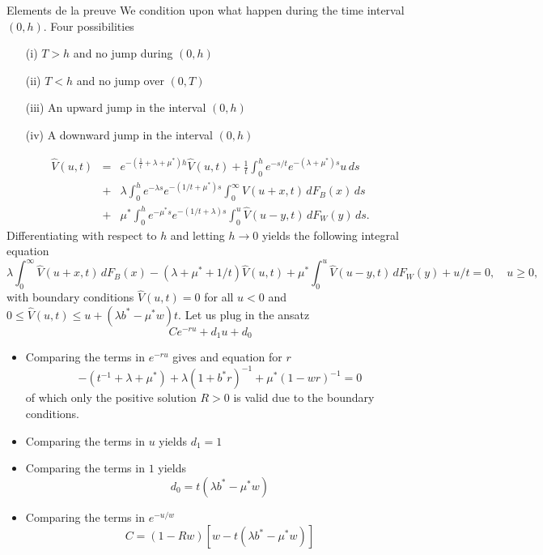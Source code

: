 \documentclass{beamer}
\def \w{\widehat}
\begin{document}
\begin{frame}[allowframebreaks]{Elements de la preuve}
\scriptsize
We condition upon what happen during the time interval $(0,h)$. Four possibilities
\begin{itemize}
  \item[(i)] $T>h$ and no jump during $(0,h)$
  \item[(ii)] $T<h$ and no jump over $(0,T)$
  \item[(iii)] An upward jump in the interval $(0,h)$
  \item[(iv)] A downward jump in the interval $(0,h)$
\end{itemize}
  \begin{eqnarray*}\label{neu0}
      \w{V}(u,t)&=& e^{-(\frac{1}{t}+\lambda+\mu^\ast)h}\w{V}(u,t) + \frac{1}{t}\int_0^h e^{-{s}/{t}}e^{-(\lambda +\mu^\ast) s} u\,ds\\
      & +& \lambda\int_0^he^{-\lambda s} e^{-({1}/{t}+\mu^\ast) s} \int_0^\infty\w{V}(u+x,t)\,dF_{B}(x)\,ds\\
      &  +&\mu^\ast \int_0^he^{-\mu^\ast s} e^{-({1}/{t}+\lambda) s}\int_0^u \w{V}(u-y,t) \,dF_W(y)\,ds.
  \end{eqnarray*}
  Differentiating with respect to $h$ and letting $h\rightarrow 0$ yields the following integral equation
  \begin{equation} \label{inteq}
    \lambda\int_0^\infty\w{V}(u+x,t)\,dF_{B}(x)-(\lambda+\mu^\ast+{1}/{t})\w{V}(u,t)+\mu^\ast\int_0^u \w{V}(u-y,t) \,dF_W(y)+{u}/{t}=0,\quad u\ge 0,
  \end{equation}
  with boundary conditions $\w{V}(u,t)=0$ for all $u<0$ and $0\leq\w{V}(u,t)\leq u+(\lambda b^\ast - \mu^\ast w)t$. Let us plug in the ansatz
  $$
  Ce^{-ru}+d_1u+d_0
  $$
  \begin{itemize}
    \item Comparing the terms in $e^{-r u}$ gives and equation for $r$
    $$
    -(t^{-1}+\lambda+\mu^\ast)+\lambda(1+b^\ast r)^{-1}+\mu^\ast(1-wr)^{-1}=0
    $$
    of which only the positive solution $R>0$ is valid due to the boundary conditions.
    \item Comparing the terms in $u$ yields $d_1 = 1$
    \item Comparing the terms in $1$ yields
    $$
    d_0 = t(\lambda b^\ast-\mu^\ast w)
    $$
    \item Comparing the terms in $e^{-u/w}$
    $$
    C = (1 - Rw)[w-t(\lambda b^\ast-\mu^\ast w)]
    $$
  \end{itemize}
\end{frame}
\end{document}
